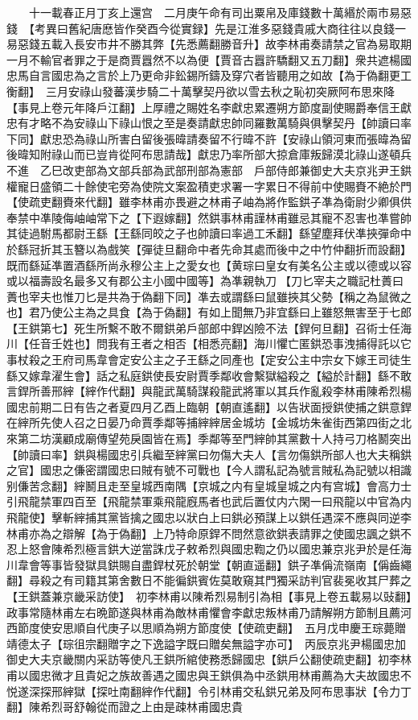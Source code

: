 　　十一載春正月丁亥上還宫　二月庚午命有司出粟帛及庫錢數十萬緡於兩市易惡錢　【考異曰舊紀唐㦄皆作癸酉今從實録】先是江淮多惡錢貴戚大商往往以良錢一易惡錢五載入長安市井不勝其弊【先悉薦翻勝音升】故李林甫奏請禁之官為易取期一月不輸官者罪之于是商賈囂然不以為便【賈音古囂許驕翻又五刀翻】衆共遮楊國忠馬自言國忠為之言於上乃更命非鈆錫所鑄及穿穴者皆聽用之如故【為于偽翻更工衡翻】　三月安祿山發蕃漢步騎二十萬擊契丹欲以雪去秋之恥初突厥阿布思來降【事見上卷元年降戶江翻】上厚禮之賜姓名李獻忠累遷朔方節度副使賜爵奉信王獻忠有才略不為安祿山下祿山恨之至是奏請獻忠帥同羅數萬騎與俱擊契丹【帥讀曰率下同】獻忠恐為祿山所害白留後張暐請奏留不行暐不許【安祿山領河東而張暐為留後暐知附祿山而已豈肯從阿布思請哉】獻忠乃率所部大掠倉庫叛歸漠北祿山遂頓兵不進　乙巳改吏部為文部兵部為武部刑部為憲部　戶部侍郎兼御史大夫京兆尹王鉷權寵日盛領二十餘使宅旁為使院文案盈積吏求署一字累日不得前中使賜賚不絶於門【使疏吏翻賚來代翻】雖李林甫亦畏避之林甫子岫為將作監鉷子凖為衛尉少卿俱供奉禁中凖陵侮岫岫常下之【下遐嫁翻】然鉷事林甫謹林甫雖忌其寵不忍害也凖嘗帥其徒過駙馬都尉王繇【王繇同皎之子也帥讀曰率過工禾翻】繇望塵拜伏凖挾彈命中於繇冠折其玉簪以為戲笑【彈徒旦翻命中者先命其處而後中之中竹仲翻折而設翻】既而繇延凖置酒繇所尚永穆公主上之愛女也【黄琮曰皇女有美名公主或以德或以容或以福壽設名最多又有郡公主小國中國等】為凖親執刀【刀匕宰夫之職記杜蕢曰蕢也宰夫也惟刀匕是共為于偽翻下同】凖去或謂繇曰鼠雖挾其父勢【稱之為鼠微之也】君乃使公主為之具食【為于偽翻】有如上聞無乃非宜繇曰上雖怒無害至于七郎【王鉷第七】死生所繫不敢不爾鉷弟戶部郎中銲凶險不法【銲何旦翻】召術士任海川【任音壬姓也】問我有王者之相否【相悉亮翻】海川懼亡匿鉷恐事洩捕得託以它事杖殺之王府司馬韋會定安公主之子王繇之同產也【定安公主中宗女下嫁王司徒生繇又嫁韋濯生會】話之私庭鉷使長安尉賈季鄰收會繫獄縊殺之【縊於計翻】繇不敢言銲所善邢縡【縡作代翻】與龍武萬騎謀殺龍武將軍以其兵作亂殺李林甫陳希烈楊國忠前期二日有告之者夏四月乙酉上臨朝【朝直遙翻】以告狀面授鉷使捕之鉷意銲在縡所先使人召之日晏乃命賈季鄰等捕縡縡居金城坊【金城坊朱雀街西第四街之北來第二坊漢顧成廟傳望苑戾園皆在焉】季鄰等至門縡帥其黨數十人持弓刀格鬭突出【帥讀曰率】鉷與楊國忠引兵繼至縡黨曰勿傷大夫人【言勿傷鉷所部人也大夫稱鉷之官】國忠之傔密謂國忠曰賊有號不可戰也【今人謂私記為號言賊私為記號以相識别傔苦念翻】縡鬭且走至皇城西南隅【京城之内有皇城皇城之内有宫城】會高力士引飛龍禁軍四百至【飛龍禁軍乘飛龍廐馬者也武后置仗内六閑一曰飛龍以中官為内飛龍使】擊斬縡捕其黨皆擒之國忠以狀白上曰鉷必預謀上以鉷任遇深不應與同逆李林甫亦為之辯解【為于偽翻】上乃特命原銲不問然意欲鉷表請罪之使國忠諷之鉷不忍上怒會陳希烈極言鉷大逆當誅戊子敕希烈與國忠鞫之仍以國忠兼京兆尹於是任海川韋會等事皆發獄具鉷賜自盡銲杖死於朝堂【朝直遥翻】鉷子凖偁流嶺南【偁齒繩翻】尋殺之有司籍其第舍數日不能徧鉷賓佐莫敢窺其門獨采訪判官裴冕收其尸葬之【王鉷蓋兼京畿采訪使】　初李林甫以陳希烈易制引為相【事見上卷五載易以䜴翻】政事常隨林甫左右晩節遂與林甫為敵林甫懼會李獻忠叛林甫乃請解朔方節制且薦河西節度使安思順自代庚子以思順為朔方節度使【使疏吏翻】　五月戊申慶王琮薨贈靖德太子【琮徂宗翻贈字之下逸謚字既曰贈矣無謚字亦可】　丙辰京兆尹楊國忠加御史大夫京畿關内采訪等使凡王鉷所綰使務悉歸國忠【鉷戶公翻使疏吏翻】初李林甫以國忠微才且貴妃之族故善遇之國忠與王鉷俱為中丞鉷用林甫薦為大夫故國忠不悦遂深探邢縡獄【探吐南翻縡作代翻】令引林甫交私鉷兄弟及阿布思事狀【令力丁翻】陳希烈哥舒翰從而證之上由是疎林甫國忠貴